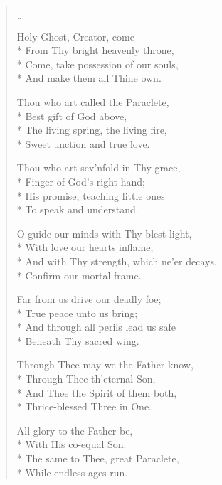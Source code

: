 \newHymn
{}

\begin{verse}[\versewidth]

 Holy Ghost, Creator, come\\*
From Thy bright heavenly throne,\\*
Come, take possession of our souls,\\*
And make them all Thine own.
\pointorig

Thou who art called the Paraclete,\\*
Best gift of God above,\\*
The living spring, the living fire,\\*
Sweet unction and true love.

Thou who art sev'nfold in Thy grace,\\*
Finger of God's right hand;\\*
His promise, teaching little ones\\*
To speak and understand.

O guide our minds with Thy blest light,\\*
With love our hearts inflame;\\*
And with Thy strength, which ne'er decays,\\*
Confirm our mortal frame.

Far from us drive our deadly foe;\\*
True peace unto us bring;\\*
And through all perils lead us safe\\*
Beneath Thy sacred wing.

Through Thee may we the Father know,\\*
Through Thee th'eternal Son,\\*
And Thee the Spirit of them both,\\*
Thrice-blessed Three in One.

All glory to the Father be,\\*
With His co-equal Son:\\*
The same to Thee, great Paraclete,\\*
While endless ages run.


\end{verse}


